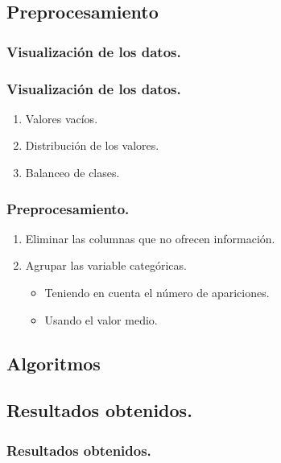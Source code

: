 \documentclass{beamer}
\theoremstyle{plain}
\theoremstyle{definition}
\theoremstyle{plain}
\theoremstyle{definition}
\theoremstyle{remark}
\theoremstyle{definition}
\theoremstyle{lem}
\theoremstyle{cor}
\begin{document}
\subsection{Preprocesamiento}
\begin{frame}
	\frametitle{Visualización de los datos.}
\end{frame}
\begin{frame}
	\frametitle{Visualización de los datos.}
	\begin{enumerate}
		\item Valores vacíos.
		\item Distribución de los valores.
		\item Balanceo de clases.
	\end{enumerate}
\end{frame}
\begin{frame}
	\frametitle{Preprocesamiento.}
	\begin{enumerate}
		\item Eliminar las columnas que no ofrecen información.
		\item Agrupar las variable categóricas.
		\begin{itemize}
			\item Teniendo en cuenta el número de apariciones.
			\item Usando el valor medio.
		\end{itemize}
\end{enumerate}
\end{frame}
\subsection{Algoritmos}
	\begin{frame}
	
	\end{frame}
\subsection{Resultados obtenidos.}
\begin{frame}
	\frametitle{Resultados obtenidos.}
\end{frame}
\end{document}
